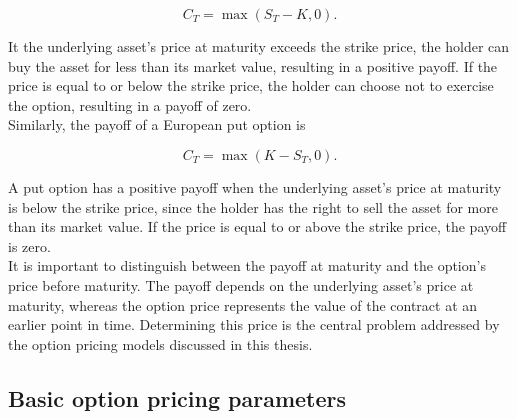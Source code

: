 \documentclass{article}
\begin{document}
	\[
	C_T = \max(S_T - K, 0).
	\]
	
	It the underlying asset's price at maturity exceeds the strike price, the holder can buy the asset for less than its market value, resulting in a positive payoff. If the price is equal to or below the strike price, the holder can choose not to exercise the option, resulting in a payoff of zero.\\
	Similarly, the payoff of a European put option is 
	
	\[
	C_T = \max(K - S_T, 0).
	\]
	
	A put option has a positive payoff when the underlying asset's price at maturity is below the strike price, since the holder has the right to sell the asset for more than its market value. If the price is equal to or above the strike price, the payoff is zero. \\
	It is important to distinguish between the payoff at maturity and the option's price before maturity. The payoff depends on the underlying asset's price at maturity, whereas the option price represents the value of the contract at an earlier point in time. Determining this price is the central problem addressed by the option pricing models discussed in this thesis.
	
	\subsection{Basic option pricing parameters}
	
\end{document}
